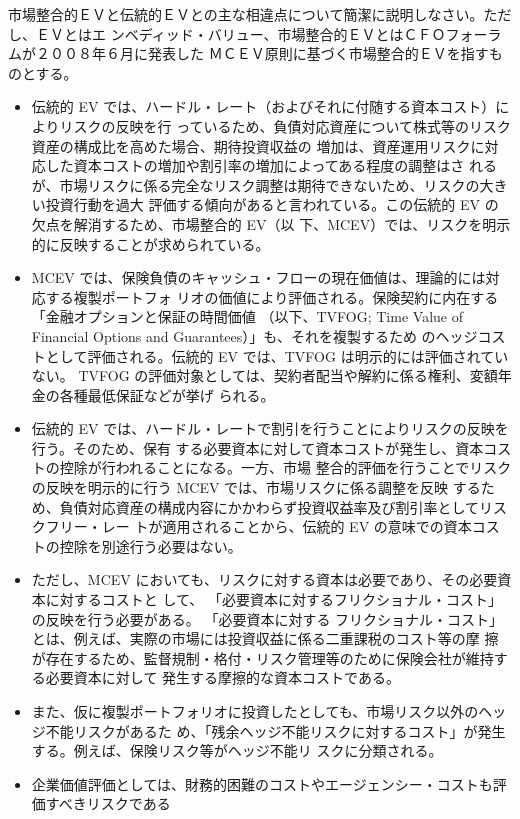 \documentclass[report,gutter=10mm,fore-edge=10mm,uplatex,dvipdfmx]{jlreq}
\begin{document}
市場整合的ＥＶと伝統的ＥＶとの主な相違点について簡潔に説明しなさい。ただし、ＥＶとはエ
ンベディッド・バリュー、市場整合的ＥＶとはＣＦＯフォーラムが２００８年６月に発表した
ＭＣＥＶ原則に基づく市場整合的ＥＶを指すものとする。
\answer{}
\begin{itemize}
\item[] 伝統的 EV では、ハードル・レート（およびそれに付随する資本コスト）によりリスクの反映を行
っているため、負債対応資産について株式等のリスク資産の構成比を高めた場合、期待投資収益の
増加は、資産運用リスクに対応した資本コストの増加や割引率の増加によってある程度の調整はさ
れるが、市場リスクに係る完全なリスク調整は期待できないため、リスクの大きい投資行動を過大
評価する傾向があると言われている。この伝統的 EV の欠点を解消するため、市場整合的 EV（以
下、MCEV）では、リスクを明示的に反映することが求められている。
\item[] MCEV では、保険負債のキャッシュ・フローの現在価値は、理論的には対応する複製ポートフォ
リオの価値により評価される。保険契約に内在する「金融オプションと保証の時間価値
（以下、TVFOG; Time Value of Financial Options and Guarantees）」も、それを複製するため
のヘッジコストとして評価される。伝統的 EV では、TVFOG は明示的には評価されていない。
TVFOG の評価対象としては、契約者配当や解約に係る権利、変額年金の各種最低保証などが挙げ
られる。
\item[] 伝統的 EV では、ハードル・レートで割引を行うことによりリスクの反映を行う。そのため、保有
する必要資本に対して資本コストが発生し、資本コストの控除が行われることになる。一方、市場
整合的評価を行うことでリスクの反映を明示的に行う MCEV では、市場リスクに係る調整を反映
するため、負債対応資産の構成内容にかかわらず投資収益率及び割引率としてリスクフリー・レー
トが適用されることから、伝統的 EV の意味での資本コストの控除を別途行う必要はない。
\item[] ただし、MCEV においても、リスクに対する資本は必要であり、その必要資本に対するコストと
して、
「必要資本に対するフリクショナル・コスト」の反映を行う必要がある。
「必要資本に対する
フリクショナル・コスト」とは、例えば、実際の市場には投資収益に係る二重課税のコスト等の摩
擦が存在するため、監督規制・格付・リスク管理等のために保険会社が維持する必要資本に対して
発生する摩擦的な資本コストである。
\item[] また、仮に複製ポートフォリオに投資したとしても、市場リスク以外のヘッジ不能リスクがあるた
め、「残余ヘッジ不能リスクに対するコスト」が発生する。例えば、保険リスク等がヘッジ不能リ
スクに分類される。
\item[] 企業価値評価としては、財務的困難のコストやエージェンシー・コストも評価すべきリスクである

\end{itemize}
\end{document}
